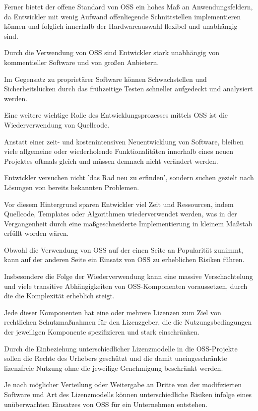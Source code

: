 Ferner bietet der offene Standard von OSS ein hohes Maß an Anwendungsfeldern, da Entwickler mit wenig Aufwand offenliegende Schnittstellen implementieren können und folglich innerhalb der Hardwareauswahl flexibel und unabhängig sind.   

Durch die Verwendung von OSS sind Entwickler stark unabhängig von kommentieller Software und von großen Anbietern.  

Im Gegensatz zu proprietärer Software können Schwachstellen und Sicherheitslücken durch das frühzeitige Testen schneller aufgedeckt und analysiert werden. 

Eine weitere wichtige Rolle des Entwicklungsprozesses mittels OSS ist die Wiederverwendung von Quellcode. 

Anstatt einer zeit- und kostenintensiven Neuentwicklung von Software, bleiben viele allgemeine oder wiederholende Funktionalitäten innerhalb eines neuen Projektes oftmals gleich und müssen demnach nicht verändert werden.

Entwickler versuchen nicht 'das Rad neu zu erfinden', sondern suchen gezielt nach Lösungen von bereits bekannten Problemen. 

Vor diesem Hintergrund sparen Entwickler viel Zeit und Ressourcen, indem Quellcode, Templates oder Algorithmen wiederverwendet werden, was in der Vergangenheit durch eine maßgeschneiderte Implementierung in kleinem Maßstab erfüllt worden wären. \cite{spinellis_how_2004} 

Obwohl die Verwendung von OSS auf der einen Seite an Popularität zunimmt, kann auf der anderen Seite ein Einsatz von OSS zu erheblichen Risiken führen. 

Insbesondere die Folge der Wiederverwendung kann eine massive Verschachtelung und viele transitive Abhängigkeiten von OSS-Komponenten voraussetzen, durch die die Komplexität erheblich steigt. 

Jede dieser Komponenten hat eine oder mehrere Lizenzen zum Ziel von rechtlichen Schutzmaßnahmen für den Lizenzgeber, die die Nutzungsbedingungen der jeweiligen Komponente spezifizieren und stark einschränken.  

Durch die Einbeziehung unterschiedlicher Lizenzmodelle in die OSS-Projekte sollen die Rechte des Urhebers geschützt und die damit uneingeschränkte lizenzfreie Nutzung ohne die jeweilige Genehmigung beschränkt werden. 

Je nach möglicher Verteilung oder Weitergabe an Dritte von der modifizierten Software und Art des Lizenzmodells können unterschiedliche Risiken infolge eines unüberwachten Einsatzes von OSS für ein Unternehmen entstehen.

